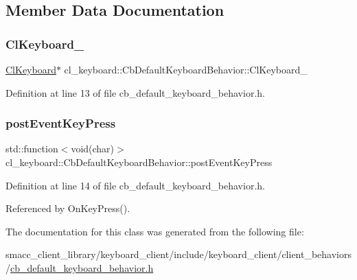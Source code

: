 \subsection{Member Data Documentation}
\mbox{\label{classcl__keyboard_1_1CbDefaultKeyboardBehavior_a482e94248b8e6fbac0973d3dec0cc20b}} 
\subsubsection{\texorpdfstring{Cl\+Keyboard\+\_\+}{ClKeyboard\_}}
{\footnotesize\ttfamily \hyperlink{classcl__keyboard_1_1ClKeyboard}{Cl\+Keyboard}$\ast$ cl\+\_\+keyboard\+::\+Cb\+Default\+Keyboard\+Behavior\+::\+Cl\+Keyboard\+\_\+}



Definition at line 13 of file cb\+\_\+default\+\_\+keyboard\+\_\+behavior.\+h.

\mbox{\label{classcl__keyboard_1_1CbDefaultKeyboardBehavior_abd29833a0f94aa1d5aa1834d15ab1281}} 
\subsubsection{\texorpdfstring{post\+Event\+Key\+Press}{postEventKeyPress}}
{\footnotesize\ttfamily std\+::function$<$void(char)$>$ cl\+\_\+keyboard\+::\+Cb\+Default\+Keyboard\+Behavior\+::post\+Event\+Key\+Press}



Definition at line 14 of file cb\+\_\+default\+\_\+keyboard\+\_\+behavior.\+h.



Referenced by On\+Key\+Press().



The documentation for this class was generated from the following file\+:\begin{DoxyCompactItemize}
\item 
smacc\+\_\+client\+\_\+library/keyboard\+\_\+client/include/keyboard\+\_\+client/client\+\_\+behaviors/\hyperlink{cb__default__keyboard__behavior_8h}{cb\+\_\+default\+\_\+keyboard\+\_\+behavior.\+h}\end{DoxyCompactItemize}
